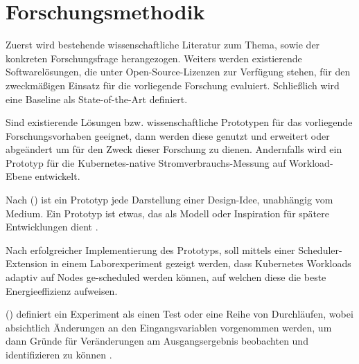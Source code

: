 \chapter{Forschungsmethodik}

Zuerst wird bestehende wissenschaftliche Literatur zum Thema, 
sowie der konkreten Forschungsfrage herangezogen.
Weiters werden existierende Softwarelösungen,
die unter Open-Source-Lizenzen zur Verfügung stehen,
für den zweckmäßigen Einsatz für die vorliegende Forschung evaluiert.
Schließlich wird eine Baseline als State-of-the-Art definiert.
\bigskip

Sind existierende Lösungen bzw. wissenschaftliche Prototypen für das vorliegende Forschungsvorhaben geeignet,
dann werden diese genutzt und erweitert oder abgeändert um für den Zweck dieser Forschung zu dienen.
Andernfalls wird ein Prototyp für die Kubernetes-native Stromverbrauchs-Messung auf Workload-Ebene entwickelt.
\bigskip

Nach 
\citeauthor{HOUDE1997367} (\citeyear{HOUDE1997367})
ist ein Prototyp jede Darstellung einer Design-Idee, unabhängig vom Medium.
Ein Prototyp ist etwas, das als Modell oder Inspiration für spätere Entwicklungen dient
\autocite{HOUDE1997367}.
\bigskip

Nach erfolgreicher Implementierung des Prototyps,
soll mittels einer Scheduler-Extension in einem Laborexperiment gezeigt werden,
dass Kubernetes Workloads adaptiv auf Nodes ge-scheduled werden können,
auf welchen diese die beste Energieeffizienz aufweisen.
\bigskip


\citeauthor{montgomery2017design} (\citeyear{montgomery2017design}) definiert ein Experiment als einen Test 
oder eine Reihe von Durchläufen, wobei absichtlich Änderungen an den Eingangsvariablen vorgenommen werden, 
um dann Gründe für Veränderungen am Ausgangsergebnis beobachten und identifizieren zu können 
\autocite{montgomery2017design}.


